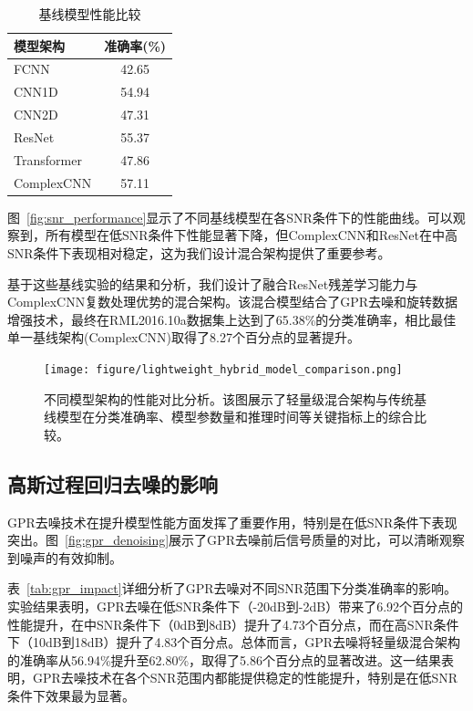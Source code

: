 \documentclass[conference]{IEEEtran}
\begin{document}
\begin{table}[h]
\centering
\caption{基线模型性能比较}
\label{tab:baseline_comparison}
\begin{tabular}{@{}lc@{}} %
\toprule
模型架构 & 准确率(\%) \\
\midrule
FCNN & 42.65 \\
CNN1D & 54.94 \\
CNN2D & 47.31 \\
ResNet & 55.37 \\
Transformer & 47.86 \\
ComplexCNN & 57.11 \\
\bottomrule
\end{tabular}
\end{table}

图~\ref{fig:snr_performance}显示了不同基线模型在各SNR条件下的性能曲线。可以观察到，所有模型在低SNR条件下性能显著下降，但ComplexCNN和ResNet在中高SNR条件下表现相对稳定，这为我们设计混合架构提供了重要参考。

基于这些基线实验的结果和分析，我们设计了融合ResNet残差学习能力与ComplexCNN复数处理优势的混合架构。该混合模型结合了GPR去噪和旋转数据增强技术，最终在RML2016.10a数据集上达到了65.38\%的分类准确率，相比最佳单一基线架构(ComplexCNN)取得了8.27个百分点的显著提升。

\begin{figure}[htbp]
\centering
\texttt{[image: figure/lightweight\_hybrid\_model\_comparison.png]}
\caption{不同模型架构的性能对比分析。该图展示了轻量级混合架构与传统基线模型在分类准确率、模型参数量和推理时间等关键指标上的综合比较。}
\label{fig:model_comparison}
\end{figure}

\subsection{高斯过程回归去噪的影响}

GPR去噪技术在提升模型性能方面发挥了重要作用，特别是在低SNR条件下表现突出。图~\ref{fig:gpr_denoising}展示了GPR去噪前后信号质量的对比，可以清晰观察到噪声的有效抑制。

表~\ref{tab:gpr_impact}详细分析了GPR去噪对不同SNR范围下分类准确率的影响。实验结果表明，GPR去噪在低SNR条件下（-20dB到-2dB）带来了6.92个百分点的性能提升，在中SNR条件下（0dB到8dB）提升了4.73个百分点，而在高SNR条件下（10dB到18dB）提升了4.83个百分点。总体而言，GPR去噪将轻量级混合架构的准确率从56.94\%提升至62.80\%，取得了5.86个百分点的显著改进。这一结果表明，GPR去噪技术在各个SNR范围内都能提供稳定的性能提升，特别是在低SNR条件下效果最为显著。
\end{document}
